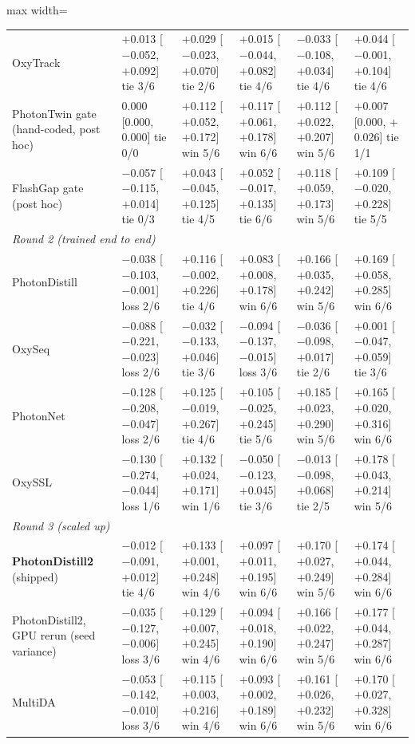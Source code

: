 {\begin{adjustbox}{max width=\linewidth}
\begin{tabular}{p{3.0cm}lllll}
OxyTrack & $+$0.013 [$-$0.052, $+$0.092] tie 3/6 & $+$0.029 [$-$0.023, $+$0.070] tie 2/6 & $+$0.015 [$-$0.044, $+$0.082] tie 4/6 & $-$0.033 [$-$0.108, $+$0.034] tie 4/6 & $+$0.044 [$-$0.001, $+$0.104] tie 4/6 \\
PhotonTwin gate (hand-coded, post hoc) & 0.000 [0.000, 0.000] tie 0/0 & $+$0.112 [$+$0.052, $+$0.172] win 5/6 & $+$0.117 [$+$0.061, $+$0.178] win 6/6 & $+$0.112 [$+$0.022, $+$0.207] win 5/6 & $+$0.007 [0.000, $+$0.026] tie 1/1 \\
FlashGap gate (post hoc) & $-$0.057 [$-$0.115, $+$0.014] tie 0/3 & $+$0.043 [$-$0.045, $+$0.125] tie 4/5 & $+$0.052 [$-$0.017, $+$0.135] tie 6/6 & $+$0.118 [$+$0.059, $+$0.173] win 5/6 & $+$0.109 [$-$0.020, $+$0.228] tie 5/5 \\
\multicolumn{6}{l}{\emph{Round 2 (trained end to end)}} \\
PhotonDistill & $-$0.038 [$-$0.103, $-$0.001] loss 2/6 & $+$0.116 [$-$0.002, $+$0.226] tie 4/6 & $+$0.083 [$+$0.008, $+$0.178] win 6/6 & $+$0.166 [$+$0.035, $+$0.242] win 5/6 & $+$0.169 [$+$0.058, $+$0.285] win 6/6 \\
OxySeq & $-$0.088 [$-$0.221, $-$0.023] loss 2/6 & $-$0.032 [$-$0.133, $+$0.046] tie 3/6 & $-$0.094 [$-$0.137, $-$0.015] loss 3/6 & $-$0.036 [$-$0.098, $+$0.017] tie 2/6 & $+$0.001 [$-$0.047, $+$0.059] tie 3/6 \\
PhotonNet & $-$0.128 [$-$0.208, $-$0.047] loss 2/6 & $+$0.125 [$-$0.019, $+$0.267] tie 4/6 & $+$0.105 [$-$0.025, $+$0.245] tie 5/6 & $+$0.185 [$+$0.023, $+$0.290] win 5/6 & $+$0.165 [$+$0.020, $+$0.316] win 6/6 \\
OxySSL & $-$0.130 [$-$0.274, $-$0.044] loss 1/6 & $+$0.132 [$+$0.024, $+$0.171] win 1/6 & $-$0.050 [$-$0.123, $+$0.045] tie 3/6 & $-$0.013 [$-$0.098, $+$0.068] tie 2/5 & $+$0.178 [$+$0.043, $+$0.214] win 5/6 \\
\multicolumn{6}{l}{\emph{Round 3 (scaled up)}} \\
\textbf{PhotonDistill2} (shipped) & $-$0.012 [$-$0.091, $+$0.012] tie 4/6 & $+$0.133 [$+$0.001, $+$0.248] win 4/6 & $+$0.097 [$+$0.011, $+$0.195] win 6/6 & $+$0.170 [$+$0.027, $+$0.249] win 5/6 & $+$0.174 [$+$0.044, $+$0.284] win 6/6 \\
PhotonDistill2, GPU rerun (seed variance) & $-$0.035 [$-$0.127, $-$0.006] loss 3/6 & $+$0.129 [$+$0.007, $+$0.245] win 4/6 & $+$0.094 [$+$0.018, $+$0.190] win 6/6 & $+$0.166 [$+$0.022, $+$0.247] win 5/6 & $+$0.177 [$+$0.044, $+$0.287] win 6/6 \\
MultiDA & $-$0.053 [$-$0.142, $-$0.010] loss 3/6 & $+$0.115 [$+$0.003, $+$0.216] win 4/6 & $+$0.093 [$+$0.002, $+$0.189] win 6/6 & $+$0.161 [$+$0.026, $+$0.232] win 5/6 & $+$0.170 [$+$0.027, $+$0.328] win 6/6 \\

\end{tabular}
\end{adjustbox}}
